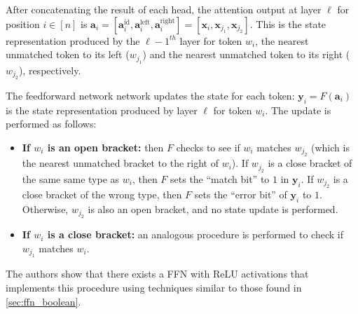 After concatenating the result of each head, the attention output at layer $\ell$ for position $i \in [n]$ is $\mathbf{a}_{i} = [\mathbf{a}_{i}^{\mathrm{id}}, \mathbf{a}_{i}^{\mathrm{left}}, \mathbf{a}_{i}^{\mathrm{right}}] = [\mathbf{x}_{i}, \mathbf{x}_{j_1}, \mathbf{x}_{j_2}]$. This is the state representation produced by the $\ell-1^{\mathit{th}}$ layer for token $w_i$, the nearest unmatched token to its left ($w_{j_1}$) and the nearest unmatched token to its right ($w_{j_2}$), respectively.

The feedforward network network updates the state for each token: $\mathbf{y}_i = F(\mathbf{a}_i)$ is the state representation produced by layer $\ell$ for token $w_i$. The update is performed as follows:
\begin{itemize}
    \item \textbf{If $w_i$ is an open bracket:} then $F$ checks to see if $w_i$ matches $w_{j_2}$ (which is the nearest unmatched bracket to the right of $w_i$). If $w_{j_2}$ is a close bracket of the same same type as $w_i$, then $F$ sets the ``match bit'' to $1$ in $\mathbf{y}_i$. If $w_{j_2}$ is a close bracket of the wrong type, then $F$ sets the ``error bit'' of $\mathbf{y}_i$ to $1$. Otherwise, $w_{j_2}$ is also an open bracket, and no state update is performed.
    \item \textbf{If $w_i$ is a close bracket:} an analogous procedure is performed to check if $w_{j_1}$ matches $w_i$.
\end{itemize}
The authors show that there exists a FFN with ReLU activations that implements this procedure using techniques similar to those found in \cref{sec:ffn_boolean}.

